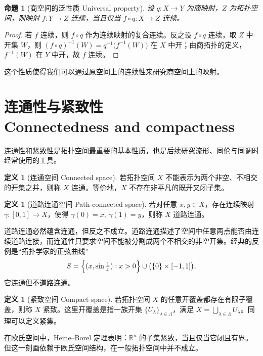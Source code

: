 \documentclass[12pt,a4paper,UTF8]{ctexart}
\newcommand{\R}{\mathbb{R}}
\newtheorem{proposition}[theorem]{命题}
\theoremstyle{definition}
\newtheorem{definition}[theorem]{定义}
\begin{document}
\begin{proposition}[商空间的泛性质 Universal property]
设 $q:X\to Y$ 为商映射，$Z$ 为拓扑空间，则映射 $f:Y\to Z$ 连续，当且仅当 $f\circ q:X\to Z$ 连续。
\end{proposition}

\begin{proof}
若 $f$ 连续，则 $f\circ q$ 作为连续映射的复合连续。反之设 $f\circ q$ 连续，取 $Z$ 中开集 $W$，则 $(f\circ q)^{-1}(W)=q^{-1}\bigl(f^{-1}(W)\bigr)$ 在 $X$ 中开；由商拓扑的定义，$f^{-1}(W)$ 在 $Y$ 中开，故 $f$ 连续。
\end{proof}

这个性质使得我们可以通过原空间上的连续性来研究商空间上的映射。

\section{连通性与紧致性\\
Connectedness and compactness}

连通性和紧致性是拓扑空间最重要的基本性质，也是后续研究流形、同伦与同调时经常使用的工具。

\begin{definition}[连通空间 Connected space]
若拓扑空间 $X$ 不能表示为两个非空、不相交的开集之并，则称 $X$ 连通。等价地，$X$ 不存在非平凡的既开又闭子集。
\end{definition}

\begin{definition}[道路连通空间 Path-connected space]
若对任意 $x,y\in X$，存在连续映射 $\gamma:[0,1]\to X$，使得 $\gamma(0)=x,\ \gamma(1)=y$，则称 $X$ 道路连通。
\end{definition}

道路连通必然蕴含连通，但反之不成立。道路连通描述了空间中任意两点能否由连续道路连接，而连通性只要求空间不能被分割成两个不相交的非空开集。经典的反例是“拓扑学家的正弦曲线”
\[
S=\Bigl\{(x,\sin\tfrac1x):x>0\Bigr\}\cup\bigl(\{0\}\times[-1,1]\bigr),
\]
它连通但不道路连通。

\begin{definition}[紧致空间 Compact space]
若拓扑空间 $X$ 的任意开覆盖都存在有限子覆盖，则称 $X$ 紧致。这里开覆盖是指一族开集 $\{U_\lambda\}_{\lambda\in\Lambda}$，满足 $X=\bigcup_{\lambda\in\Lambda}U_\lambda$。同理可以定义紧集。
\end{definition}

在欧氏空间中，Heine--Borel 定理表明：$\R^n$ 的子集紧致，当且仅当它闭且有界。但这一刻画依赖于欧氏空间结构，在一般拓扑空间中并不成立。
\end{document}
